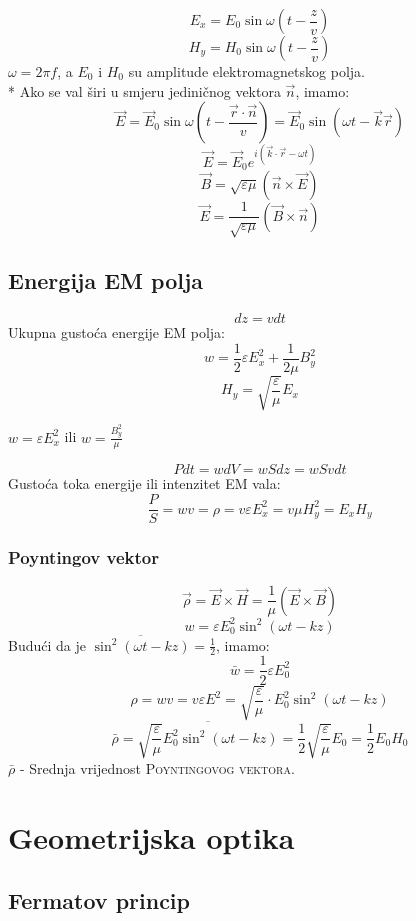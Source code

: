\documentclass{report}
\begin{document}
{$$E_x = E_0 \sin \omega \left (t - \frac{z}{v} \right )$$
$$H_y = H_0 \sin \omega \left (t - \frac{z}{v} \right )$$
$\omega = 2 \pi f$, a $E_0$ i $H_0$ su amplitude elektromagnetskog polja.\\*
Ako se val širi u smjeru jediničnog vektora $\vec n$, imamo:
$$\vec E = \vec E _0 \sin \omega \left (t - \frac{\vec r \cdot \vec n}{v} \right ) = \vec E _0 \sin \left ( \omega t - \vec k \vec r \right )$$
$$\vec E = \vec E _0 e^{i (\vec k \cdot \vec r - \omega t)}$$
$$\vec B = \sqrt{\varepsilon \mu} (\vec n \times \vec E)$$
$$\vec E = \frac{1}{\sqrt{\varepsilon \mu}} (\vec B \times \vec n)$$

\section{Energija EM polja}

$$dz = vdt$$
Ukupna gustoća energije EM polja:
$$w = \frac{1}{2} \varepsilon E^2 _x + \frac{1}{2 \mu} B^2_y$$
$$H_y = \sqrt{\frac{\varepsilon}{\mu}}E_x$$
\begin{center}
	$w = \varepsilon E^2_x$ ili $w = \frac{B^2_y}{\mu}$
\end{center}
$$Pdt = wdV = wSdz = wSvdt$$
Gustoća toka energije ili intenzitet EM vala:
$$\frac{P}{S} = wv = \rho = v \varepsilon E^2_x = v \mu H^2_y = E_x H_y$$

\subsection{Poyntingov vektor}

$$\vec \rho = \vec E \times \vec H = \frac{1}{\mu}(\vec E \times \vec B)$$
$$w = \varepsilon E ^2 _0 \sin^2 (\omega t - kz)$$
Budući da je $\overline {\sin^2(\omega t - kz)} = \frac{1}{2}$, imamo:
$$\bar w = \frac{1}{2} \varepsilon E^2_0 $$
$$\rho = w v = v \varepsilon E^2 = \sqrt{\frac{\varepsilon}{\mu}} \cdot E^2_0 \sin^2(\omega t - kz)$$
$$\bar \rho = \overline {\sqrt{\frac{\varepsilon}{\mu}} E^2_0 \sin^2(\omega t - kz)} = \frac{1}{2} \sqrt{\frac{\varepsilon}{\mu}} E_0 = \frac{1}{2} E_0 H_0$$
$\bar{\rho}$ - Srednja vrijednost \textsc{Poyntingovog vektora}.

\chapter{Geometrijska optika}

\section{Fermatov princip}

}
\end{document}
